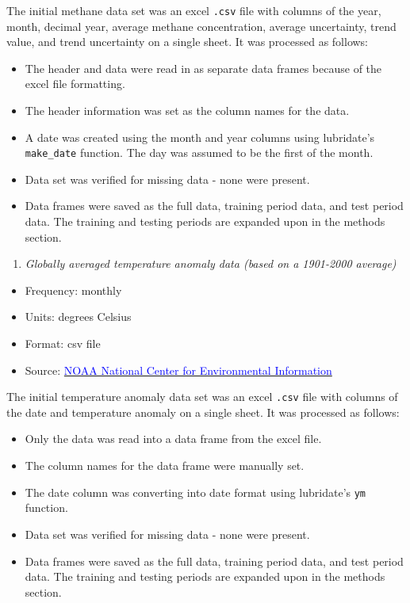 \documentclass[
]{article}
\providecommand{\tightlist}{%
  \setlength{\itemsep}{0pt}\setlength{\parskip}{0pt}}
\begin{document}
The initial methane data set was an excel \texttt{.csv} file with
columns of the year, month, decimal year, average methane concentration,
average uncertainty, trend value, and trend uncertainty on a single
sheet. It was processed as follows:

\begin{itemize}
\tightlist
\item
  The header and data were read in as separate data frames because of
  the excel file formatting.
\item
  The header information was set as the column names for the data.
\item
  A date was created using the month and year columns using lubridate's
  \texttt{make\_date} function. The day was assumed to be the first of
  the month.
\item
  Data set was verified for missing data - none were present.
\item
  Data frames were saved as the full data, training period data, and
  test period data. The training and testing periods are expanded upon
  in the methods section.
\end{itemize}

\begin{enumerate}
\def\labelenumi{\arabic{enumi}.}
\setcounter{enumi}{1}
\tightlist
\item
  \emph{Globally averaged temperature anomaly data (based on a 1901-2000
  average)}
\end{enumerate}

\begin{itemize}
\tightlist
\item
  Frequency: monthly
\item
  Units: degrees Celsius
\item
  Format: csv file
\item
  Source:
  \href{https://www.ncei.noaa.gov/access/monitoring/climate-at-a-glance/global/time-series}{\textcolor{blue}{NOAA National Center for Environmental Information}}
\end{itemize}

The initial temperature anomaly data set was an excel \texttt{.csv} file
with columns of the date and temperature anomaly on a single sheet. It
was processed as follows:

\begin{itemize}
\tightlist
\item
  Only the data was read into a data frame from the excel file.
\item
  The column names for the data frame were manually set.
\item
  The date column was converting into date format using lubridate's
  \texttt{ym} function.
\item
  Data set was verified for missing data - none were present.
\item
  Data frames were saved as the full data, training period data, and
  test period data. The training and testing periods are expanded upon
  in the methods section.
\end{itemize}
\end{document}
